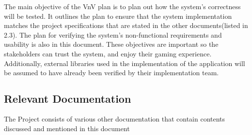 \documentclass[12pt, titlepage]{article}
\begin{document}
The main objective of the VnV plan is to plan out how the system's correctness will be tested. It outlines the plan to ensure that the system implementation matches the project specifications that are stated in the other documents(listed in 2.3). The plan for verifying the system's non-functional requirements and usability is also in this document. These objectives are important so the stakeholders can trust the system, and enjoy their gaming experience. Additionally, external libraries used in the implementation of the application will be assumed to have already been verified by their implementation team.



\subsection{Relevant Documentation}

  
The Project consists of various other documentation that contain contents discussed and mentioned in this document
  
\end{document}
